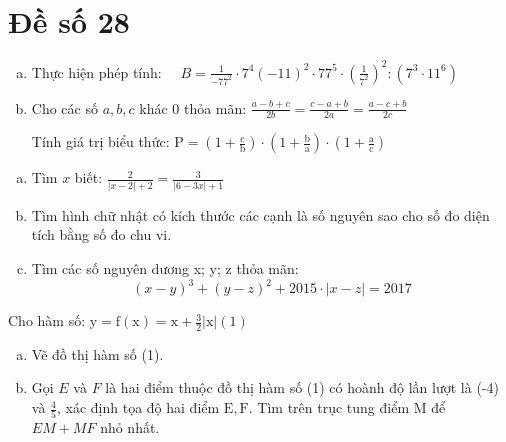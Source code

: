 \section{Đề số 28}

\begin{bt} 
   \hfill
   \begin{enumerate}[a.]
    \item Thực hiện phép tính: $\quad B=\frac{1}{-77^2} \cdot 7^4(-11)^2 \cdot 77^5 \cdot\left(\frac{1}{7^2}\right)^2:\left(7^3 \cdot 11^6\right)$
    \item Cho các số $a, b, c$ khác 0 thỏa mãn: $\frac{a-b+c}{2 b}=\frac{c-a+b}{2 a}=\frac{a-c+b}{2 c}$
    
    Tính giá trị biểu thức: $\mathrm{P}=\left(1+\frac{\mathrm{c}}{\mathrm{b}}\right) \cdot\left(1+\frac{\mathrm{b}}{\mathrm{a}}\right) \cdot\left(1+\frac{\mathrm{a}}{\mathrm{c}}\right)$
   \end{enumerate}
\loigiai{}
\end{bt}

\begin{bt}
    \hfill
	\begin{enumerate}[a.]
        \item Tìm $x$ biết: $\frac{2}{|x-2|+2}=\frac{3}{|6-3 x|+1}$
        \item Tìm hình chữ nhật có kích thước các cạnh là số nguyên sao cho số đo diện tích bằng số đo chu vi.
        \item Tìm các số nguyên dương x; y; z thỏa mãn:
        $$
        (x-y)^3+(y-z)^2+2015 \cdot|x-z|=2017
        $$
    \end{enumerate}
	\loigiai{} 
\end{bt}

\begin{bt}
    Cho hàm số: $\mathrm{y}=\mathrm{f}(\mathrm{x})=\mathrm{x}+\frac{3}{2}|\mathrm{x}|(1)$
    \begin{enumerate}[a.]
        \item Vẽ đồ thị hàm số (1).
        \item Gọi $E$ và $F$ là hai điểm thuộc đồ thị hàm số (1) có hoành độ lần lượt là (-4) và $\frac{4}{5}$, xác định tọa độ hai điểm $\mathrm{E}, \mathrm{F}$. Tìm trên trục tung điểm $\mathrm{M}$ để $EM+MF$ nhỏ nhất.
    \end{enumerate}
	\loigiai{}
\end{bt}

